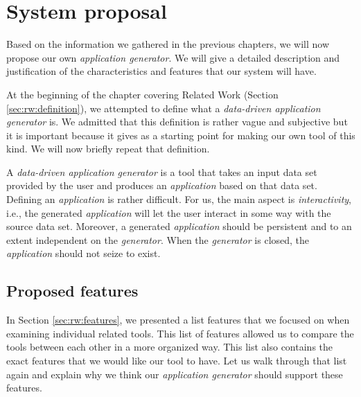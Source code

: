 \chapter{System proposal}

Based on the information we gathered in the previous chapters, we will now propose our own \emph{application generator}. We will give a detailed description and justification of the characteristics and features that our system will have. 

At the beginning of the chapter covering Related Work (Section \ref{sec:rw:definition}), we attempted to define what a \emph{data-driven application generator} is. We admitted that this definition is rather vague and subjective but it is important because it gives as a starting point for making our own tool of this kind. We will now briefly repeat that definition.

A \emph{data-driven application generator} is a tool that takes an input data set provided by the user and produces an \emph{application} based on that data set. Defining an \emph{application} is rather difficult. For us, the main aspect is \emph{interactivity}, i.e., the generated \emph{application} will let the user interact in some way with the source data set. Moreover, a generated \emph{application} should be persistent and to an extent independent on the \emph{generator}. When the \emph{generator} is closed, the \emph{application} should not seize to exist.

\section{Proposed features}

In Section \ref{sec:rw:features}, we presented a list features that we focused on when examining individual related tools. This list of features allowed us to compare the tools between each other in a more organized way. This list also contains the exact features that we would like our tool to have. Let us walk through that list again and explain why we think our \emph{application generator} should support these features.

